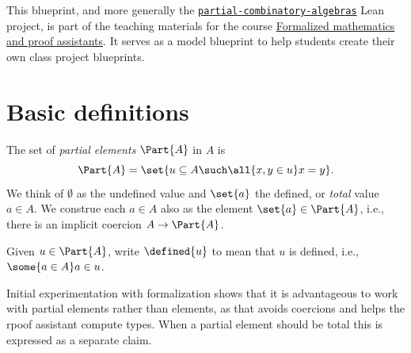 
%

\begin{abstract}
  We outline a plan of formalization for partial combinatory algebras (PCA), including combinatory completeness,
  programming with PCAs, and some examples of PCAs. Time permitting, we will formalize the typed version as well.
\end{abstract}


This blueprint, and more generally the \href{https://github.com/andrejbauer/partial-combinatory-algebras}{\texttt{partial-combinatory-algebras}} Lean project, is part of the teaching materials for the course \href{https://www.andrej.com/zapiski/MAT-FORMATH-2024/book/}{Formalized mathematics and proof assistants}.
It serves as a model blueprint to help students create their own class project blueprints.

\section{Basic definitions}

The set of \emph{partial elements} $\Part{A}$ in $A$ is
%
\begin{equation*}
  \Part{A} = \set{ u \subseteq A \such \all{x, y \in u} x = y}.
\end{equation*}
%
We think of $\emptyset$ as the undefined value and $\set{a}$ the defined, or \emph{total} value $a \in A$.
We construe each $a \in A$ also as the element $\set{a} \in \Part{A}$, i.e., there is an implicit coercion $A \to \Part{A}$.

Given $u \in \Part{A}$, write $\defined{u}$ to mean that $u$ is defined, i.e., $\some{a \in A} a \in u$.

Initial experimentation with formalization shows that it is advantageous to work with partial elements rather than elements, as that avoids coercions and helps the rpoof assistant compute types. When a partial element should be total this is expressed as a separate claim.

